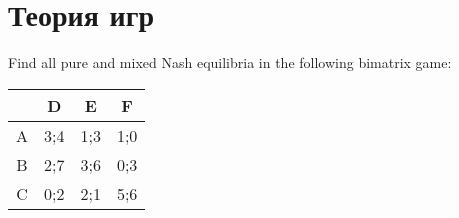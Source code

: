 






\section{Теория игр}


\begin{problem}
Find all pure and mixed Nash equilibria in the following bimatrix game:


\begin{tabular}{c|ccc}
 & D & E & F \\ 
\hline 
A & 3;4 & 1;3 & 1;0  \\ 
B & 2;7 & 3;6 & 0;3  \\ 
C & 0;2 & 2;1 & 5;6  \\ 
\end{tabular} 
\end{problem}

